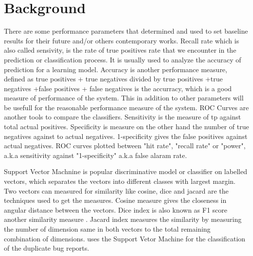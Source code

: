 \documentclass[]{sig-alternate-05-2015}
\begin{document}
\section{Background}
There are some performance parameters that determined and used to set baseline results for their future and/or others contemporary works. Recall rate which is also called sensivity, is the rate of true positives rate that we  encounter in the prediction or classification process. It is usually used to analyze the accuracy of prediction for a learning model. Accuracy is another performance measure, defined as true positives + true negatives divided by true positives +true negatives +false positives + false negatives is the accurracy, which is a good measure of performance of the system. This in addition to other parameters will be usefull for the reasonable performance measure of the system. ROC Curves are another tools to compare the classifiers. Sensitivity is the measure of tp against total actual positives. Specificity is measure on the other hand the number of true negatives against to actual negatives. 1-specificity gives the false positives against actual negatives. ROC curves plotted between "hit rate", "recall rate" or "power", a.k.a sensitivity against "1-specificity" a.k.a false alaram rate. \newline

Support Vector Machnine \cite{Chih-WeiHsuChih-ChungChang2008} is popular discriminative model or classifier on labelled vectors, which  separates the vectors into different classes with largest margin. Two vectors can measured for similarity like cosine, dice and jacard are the techniques used to get the measures. Cosine measure gives the closeness in angular distance between the vectors. Dice index is also known as F1 score another similarity measure . Jacard index measures the similarity by measuring the number of dimension same in both vectors to the total remaining combination of dimensions. \cite{Sun2010} uses the Support Vetor Machine for the classification of the duplicate bug reports. \newline
\end{document}

